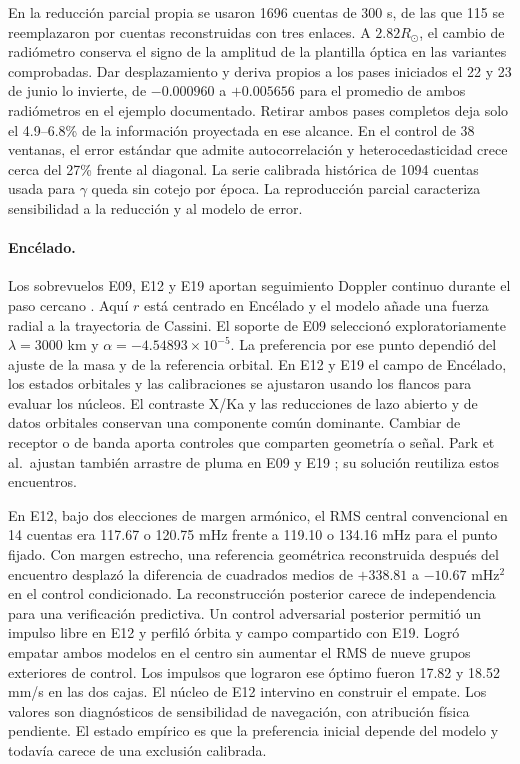 \documentclass[11pt,a4paper]{article}
\begin{document}
En la reducción parcial propia se usaron 1696 cuentas de 300 s, de las que 115 se reemplazaron por cuentas reconstruidas con tres enlaces. A $2.82R_\odot$, el cambio de radiómetro conserva el signo de la amplitud de la plantilla óptica en las variantes comprobadas. Dar desplazamiento y deriva propios a los pases iniciados el 22 y 23 de junio lo invierte, de $-0.000960$ a $+0.005656$ para el promedio de ambos radiómetros en el ejemplo documentado. Retirar ambos pases completos deja solo el 4.9--6.8\% de la información proyectada en ese alcance. En el control de 38 ventanas, el error estándar que admite autocorrelación y heterocedasticidad crece cerca del 27\% frente al diagonal. La serie calibrada histórica de 1094 cuentas usada para $\gamma$ queda sin cotejo por época. La reproducción parcial caracteriza sensibilidad a la reducción y al modelo de error.

\paragraph{Encélado.} Los sobrevuelos E09, E12 y E19 aportan seguimiento Doppler continuo durante el paso cercano \cite{iess,park,jplenc}. Aquí $r$ está centrado en Encélado y el modelo añade una fuerza radial a la trayectoria de Cassini. El soporte de E09 seleccionó exploratoriamente $\lambda=3000$ km y $\alpha=-4.54893\times10^{-5}$. La preferencia por ese punto dependió del ajuste de la masa y de la referencia orbital. En E12 y E19 el campo de Encélado, los estados orbitales y las calibraciones se ajustaron usando los flancos para evaluar los núcleos. El contraste X/Ka y las reducciones de lazo abierto y de datos orbitales conservan una componente común dominante. Cambiar de receptor o de banda aporta controles que comparten geometría o señal. Park et al.\ ajustan también arrastre de pluma en E09 y E19 \cite{park}; su solución reutiliza estos encuentros.

En E12, bajo dos elecciones de margen armónico, el RMS central convencional en 14 cuentas era 117.67 o 120.75 mHz frente a 119.10 o 134.16 mHz para el punto fijado. Con margen estrecho, una referencia geométrica reconstruida después del encuentro desplazó la diferencia de cuadrados medios de $+338.81$ a $-10.67$ mHz$^2$ en el control condicionado. La reconstrucción posterior carece de independencia para una verificación predictiva. Un control adversarial posterior permitió un impulso libre en E12 y perfiló órbita y campo compartido con E19. Logró empatar ambos modelos en el centro sin aumentar el RMS de nueve grupos exteriores de control. Los impulsos que lograron ese óptimo fueron 17.82 y 18.52 mm/s en las dos cajas. El núcleo de E12 intervino en construir el empate. Los valores son diagnósticos de sensibilidad de navegación, con atribución física pendiente. El estado empírico es que la preferencia inicial depende del modelo y todavía carece de una exclusión calibrada.
\end{document}
